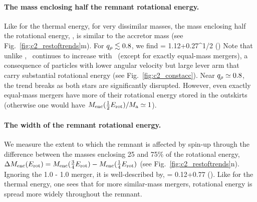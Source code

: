 
\paragraph{The mass enclosing half the remnant rotational energy.} Like for the thermal energy, for very dissimilar masses, the mass enclosing half the rotational energy, \MErotfifty, is similar to the accretor mass (see Fig.~\ref{fig:c2_restoftrends}m).  For $\qrho\lesssim0.8$, we find
\eqbegin
\frac{\MErotfifty}{\Ma} = 1.12+0.27\qrho^{1/2}
\qquad()
\eqend
Note that unlike {\MencOmax}, \MErotfifty\ continues to increase with \qrho\ (except for exactly equal-mass mergers), a consequence of particles with lower angular velocity but large lever arm that carry substantial rotational energy (see Fig.~\ref{fig:c2_constacc}).  Near $\qrho\simeq0.8$, the trend breaks as both stars are significantly disrupted.  However, even exactly equal-mass mergers have more of their rotational energy stored in the outskirts (otherwise one would have $\MErotfifty/\Ma\simeq1$).  

\paragraph{The width of the remnant rotational energy.}  We measure the extent to which the remnant is affected by spin-up through the difference between the masses enclosing 25 and 75\% of the rotational energy, $\MErotthick = M_{\rm enc}(\frac{3}{4}E_\mathrm{rot}) - M_{\rm enc}(\frac{1}{4}E_\mathrm{rot})$ (see Fig.~\ref{fig:c2_restoftrends}n).  Ignoring the 1.0 - 1.0 {\Msun} merger, it is well-described by,
\eqbegin
\frac{\MErotthick}{\Ma} = 0.12+0.77\qrho
\qquad().
\eqend
Like for the thermal energy, one sees that for more similar-mass mergers, rotational energy is spread more widely throughout the remnant.

